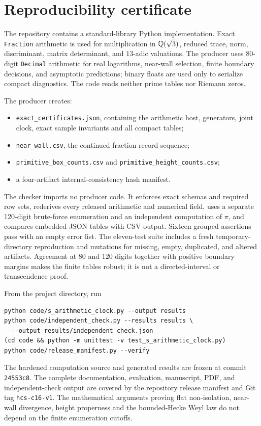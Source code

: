 \section{Reproducibility certificate}

The repository contains a standard-library Python implementation.  Exact
\texttt{Fraction} arithmetic is used for multiplication in $\mathbb{Q}(\sqrt3)$,
reduced trace, norm, discriminant, matrix determinant, and $13$-adic
valuations.  The producer uses 80-digit \texttt{Decimal} arithmetic for real
logarithms, near-wall selection, finite boundary decisions, and asymptotic
predictions; binary floats are used only to serialize compact diagnostics.
The code reads neither prime tables nor Riemann zeros.

The producer creates:
\begin{itemize}
\item \texttt{exact\_certificates.json}, containing the arithmetic host,
generators, joint clock, exact sample invariants and all compact tables;
\item \texttt{near\_wall.csv}, the continued-fraction record sequence;
\item \texttt{primitive\_box\_counts.csv} and
\texttt{primitive\_height\_counts.csv};
\item a four-artifact internal-consistency hash manifest.
\end{itemize}

The checker imports no producer code.  It enforces exact schemas and required
row sets, rederives every released arithmetic and numerical field, uses a
separate 120-digit brute-force enumeration and an independent computation of
$\pi$, and compares embedded JSON tables with CSV output.  Sixteen grouped
assertions pass with an empty error list.  The eleven-test suite includes a
fresh temporary-directory reproduction and mutations for missing, empty,
duplicated, and altered artifacts.  Agreement at 80 and 120 digits together
with positive boundary margins makes the finite tables robust; it is not a
directed-interval or transcendence proof.

From the project directory, run
\begin{verbatim}
python code/s_arithmetic_clock.py --output results
python code/independent_check.py --results results \
  --output results/independent_check.json
(cd code && python -m unittest -v test_s_arithmetic_clock.py)
python code/release_manifest.py --verify
\end{verbatim}

The hardened computation source and generated results are frozen at commit
\texttt{24553c8}.  The complete documentation, evaluation, manuscript, PDF,
and independent-check output are covered by the repository release manifest
and Git tag \texttt{hcs-c16-v1}.  The
mathematical arguments proving flat non-isolation, near-wall divergence,
height properness and the bounded-Hecke Weyl law do not depend on the finite
enumeration cutoffs.
